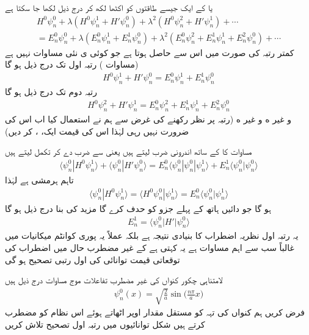 یا  کے ایک جیسے طاقتوں کو اکٹھا لکھ کر درج ذیل لکھا جا سکتا ہے 
\begin{multline*}
H^0 \psi_n^0 + \lambda (H^0 \psi_n^1 + H' \psi_n^0) + \lambda^2 (H^0 \psi_n^2 + H' \psi_n^1) + \cdots \\
= E_n^0 \psi_n^0 + \lambda (E_n^0 \psi_n^1 + E_n^1 \psi_n^0) + \lambda^2 (E_n^0 \psi_n^2 + E_n^1 \psi_n^1 + E_n^2 \psi_n^0) + \cdots
\end{multline*}
 کمتر رتبہ  کی صورت میں اس سے  حاصل ہوتا ہے جو  کوئی ی نئی مساوات نہیں ہے (مساوات ) رتبہ اول  تک درج ذیل ہو گا 
\begin{align}\label{مساوات_اضطراب_رتبہ_اول}
H^0 \psi_n^1 + H' \psi_n^0 = E_n^0 \psi_n^1 + E_n^1 \psi_n^0
\end{align}
رتبہ دوم  تک درج ذیل ہو گا 
\begin{align}\label{مساوات_اضطراب_رتبہ_دوم}
H^0 \psi_n^2 + H' \psi_n^1 = E_n^0 \psi_n^2 + E_n^1 \psi_n^1 + E_n^2 \psi_n^0
\end{align}
و غیر ه و غیر ه (رتبہ  پر نظر رکھنے کی غرض سے ہم نے  استعمال کیا اب اس کی ضرورت نہیں رہی لہٰذا اس کی قیمت ایک، ، کر دیں)

مساوات  کا  کے ساتھ اندرونی ضرب لیتے ہیں یعنی  سے ضرب دے کر تکمل لیتے ہیں 
\begin{align*}
\langle \psi_n^0 | H^0 \psi_n^1 \rangle + \langle \psi_n^0 | H' \psi_n^0 \rangle = E_n^0 \langle \psi_n^0 | \psi_n^0 | \psi_n^1 \rangle + E_n^1 \langle \psi_n^0 | \psi_n^0 \rangle
\end{align*}
تاہم  ہرمشی ہے لہٰذا
\begin{align*}
\langle \psi_n^0 | H^0 \psi_n^1 \rangle = \langle H^0 \psi_n^0 | \psi_n^1 \rangle = E_n^0 \langle \psi_n^0 | \psi_n^1 \rangle
\end{align*}
 ہو گا جو دائیں ہاتھ کے پہلے  جزو کو حدف کرے گا مزید   
کی بنا درج ذیل ہو گا 
\begin{align}
E_n^1 = \langle \psi_n^0 | H' | \psi_n^0 \rangle
\end{align}
یہ رتبہ اول نظریہ اضطراب کا بنیادی نتیجہ ہے بلکہ عملاً یہ پوری کوانٹم میکانیات میں غالباً سب سے اہم مساوات ہے یہ کہتی ہے کے  غیر  مضطرب حال میں اضطراب کی توقعاتی قیمت توانائی کی  اول رتبی   تصحیح ہو گی 

لامتناہی چکور کنواں کی غیر مضطرب تفاعلات موج مساوات  درج ذیل ہیں  
\begin{align*}
\psi_n^0 (x) = \sqrt{\frac{2}{a}} \sin \big (\frac{n \pi}{a} x\big )
\end{align*}
 فرض کریں ہم کنواں کی تہہ کو مستقل مقدار  اوپر اٹھاتے ہوئے اس نظام کو مضطرب کرتے ہیں شکل  توانائیوں میں رتبہ اول  تصحیح تلاش کریں 

